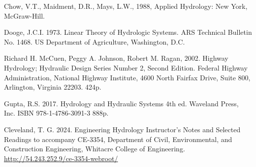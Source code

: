 \documentclass[12pt]{article}
\begin{document}
\begin{thebibliography}{}

Chow, V.T., Maidment, D.R., Mays, L.W., 1988, Applied Hydrology: New York,
McGraw-Hill.

Dooge, J.C.I. 1973.  Linear Theory of Hydrologic Systems. ARS Technical Bulletin No. 1468.  US Department of Agriculture, Washington, D.C.

Richard H. McCuen, Peggy A. Johnson, Robert M. Ragan, 2002.  Highway Hydrology; Hydraulic Design Series Number 2, Second Edition.  
Federal Highway Administration, National Highway Institute, 4600 North Fairfax Drive, Suite 800, Arlington, Virginia 22203.  424p.

Gupta, R.S. 2017. Hydrology and Hydraulic Systems 4th ed. Waveland Press, Inc. ISBN 978-1-4786-3091-3 888p.

Cleveland, T. G. 2024. Engineering Hydrology Instructor's Notes and Selected Readings to accompany CE-3354, Department of Civil, Environmental, and Construction Engineering, Whitacre College of Engineering. \url{http://54.243.252.9/ce-3354-webroot/}

\end{thebibliography}
\end{document}
